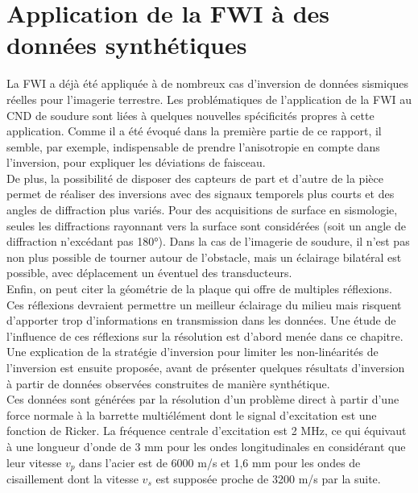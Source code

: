 \chapter{Application de la FWI à des données synthétiques \label{applications}}

La FWI a déjà été appliquée à de nombreux cas d'inversion de données sismiques réelles pour l'imagerie terrestre. Les problématiques de l'application de la FWI au CND de soudure sont liées à quelques nouvelles spécificités propres à cette application. Comme il a été évoqué dans la première partie de ce rapport, il semble, par exemple, indispensable de prendre l'anisotropie en compte dans l'inversion, pour expliquer les déviations de faisceau.\\

De plus, la possibilité de disposer des capteurs de part et d'autre de la pièce permet de réaliser des inversions avec des signaux temporels plus courts et des angles de diffraction plus variés. Pour des acquisitions de surface en sismologie, seules les diffractions rayonnant vers la surface sont considérées (soit un angle de diffraction n'excédant pas 180°). Dans la cas de l'imagerie de soudure, il n'est pas non plus possible de tourner autour de l'obstacle, mais un éclairage bilatéral est possible, avec déplacement un éventuel des transducteurs.\\

Enfin, on peut citer la géométrie de la plaque qui offre de multiples réflexions. Ces réflexions devraient permettre un meilleur éclairage du milieu mais risquent d'apporter trop d'informations en transmission dans les données. Une étude de l'influence de ces réflexions sur la résolution est d'abord menée dans ce chapitre. Une explication de la stratégie d'inversion pour limiter les non-linéarités de l'inversion est ensuite proposée, avant de présenter quelques résultats d'inversion à partir de données observées construites de manière synthétique.\\

Ces données sont générées par la résolution d'un problème direct à partir d'une force normale à la barrette multiélément dont le signal d'excitation est une fonction de Ricker. La fréquence centrale d'excitation est 2 MHz,  ce qui équivaut à une longueur d'onde de 3 mm pour les ondes longitudinales en considérant que leur vitesse $v_{p}$ dans l'acier est de 6000 m/s et 1,6 mm pour les ondes de cisaillement dont la vitesse $v_{s}$ est supposée proche de 3200 m/s par la suite.

